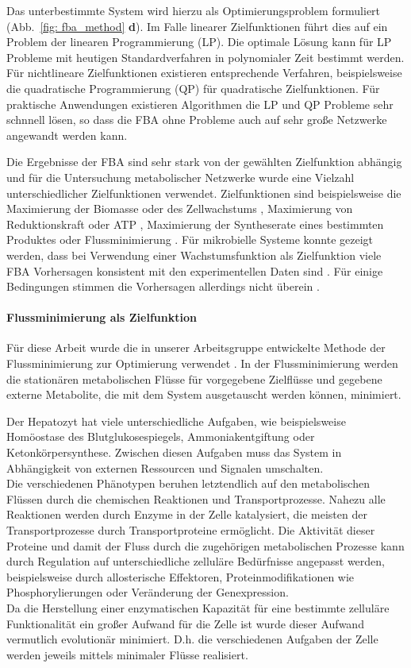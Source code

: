 Das unterbestimmte System wird hierzu als Optimierungsproblem formuliert (Abb.~\ref{fig: fba_method} \textbf{d}). Im Falle linearer Zielfunktionen führt dies auf ein Problem der linearen Programmierung (LP). Die optimale Lösung kann für LP Probleme mit heutigen Standardverfahren in polynomialer Zeit bestimmt werden. Für nichtlineare Zielfunktionen existieren entsprechende Verfahren, beispielsweise die quadratische Programmierung (QP) für quadratische Zielfunktionen. Für praktische Anwendungen existieren Algorithmen die LP und QP Probleme sehr schnnell lösen, so dass die FBA ohne Probleme auch auf sehr große Netzwerke angewandt werden kann.

Die Ergebnisse der FBA sind sehr stark von der gewählten Zielfunktion abhängig und für die Untersuchung metabolischer Netzwerke wurde eine Vielzahl unterschiedlicher Zielfunktionen verwendet. 
Zielfunktionen sind beispielsweise die Maximierung der Biomasse oder des Zellwachstums \cite{Mahadevan2002, Dien2002}, Maximierung von Reduktionskraft oder ATP \cite{Ramakrishna2001}, Maximierung der Syntheserate eines bestimmten Produktes \cite{Varma1993} oder Flussminimierung \cite{Holzhuetter2004}. Für mikrobielle Systeme konnte gezeigt werden, dass bei Verwendung einer Wachstumsfunktion als Zielfunktion viele FBA Vorhersagen konsistent mit den experimentellen Daten sind \cite{Ibarra2002, Burgard2003,Edwards2000}. Für einige Bedingungen stimmen die Vorhersagen allerdings nicht überein \cite{Ibarra2002, Segre2002, Burgard2003}.

\paragraph{Flussminimierung als Zielfunktion}
Für diese Arbeit wurde die in unserer Arbeitsgruppe entwickelte Methode der Flussminimierung zur Optimierung verwendet \cite{Holzhuetter2004}. In der Flussminimierung werden die stationären metabolischen Flüsse für vorgegebene Zielflüsse und gegebene externe Metabolite, die mit dem System ausgetauscht werden können, minimiert. 

Der Hepatozyt hat viele unterschiedliche Aufgaben, wie beispielsweise Homöostase des Blutglukosespiegels, Ammoniakentgiftung oder Ketonkörpersynthese. Zwischen diesen Aufgaben muss das System in Abhängigkeit von externen Ressourcen und Signalen umschalten.\\
Die verschiedenen Phänotypen beruhen letztendlich auf den metabolischen Flüssen durch die chemischen Reaktionen und Transportprozesse. Nahezu alle Reaktionen werden durch Enzyme in der Zelle katalysiert, die meisten der Transportprozesse durch Transportproteine ermöglicht. Die Aktivität dieser Proteine und damit der Fluss durch die zugehörigen metabolischen Prozesse kann durch Regulation auf unterschiedliche zelluläre Bedürfnisse angepasst werden, beispielsweise durch allosterische Effektoren, Proteinmodifikationen wie Phosphorylierungen oder Veränderung der Genexpression.\\
Da die Herstellung einer enzymatischen Kapazität für eine bestimmte zelluläre Funktionalität ein großer Aufwand für die Zelle ist wurde dieser Aufwand vermutlich evolutionär minimiert. D.h. die verschiedenen Aufgaben der Zelle werden jeweils mittels minimaler Flüsse realisiert.

